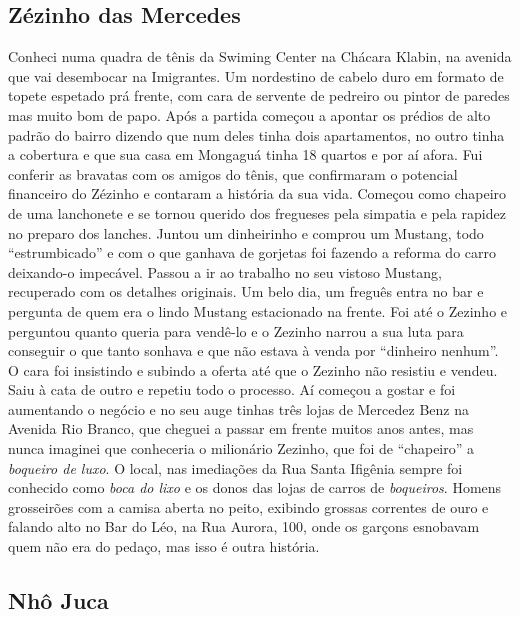 \documentclass[12pt,brazil,]{book}
\begin{document}
\subsection{Zézinho das Mercedes}\label{zuxe9zinho-das-mercedes}

Conheci numa quadra de tênis da Swiming Center na Chácara Klabin, na
avenida que vai desembocar na Imigrantes. Um nordestino de cabelo duro
em formato de topete espetado prá frente, com cara de servente de
pedreiro ou pintor de paredes mas muito bom de papo. Após a partida
começou a apontar os prédios de alto padrão do bairro dizendo que num
deles tinha dois apartamentos, no outro tinha a cobertura e que sua casa
em Mongaguá tinha 18 quartos e por aí afora. Fui conferir as bravatas
com os amigos do tênis, que confirmaram o potencial financeiro do
Zézinho e contaram a história da sua vida. Começou como chapeiro de uma
lanchonete e se tornou querido dos fregueses pela simpatia e pela
rapidez no preparo dos lanches. Juntou um dinheirinho e comprou um
Mustang, todo ``estrumbicado'' e com o que ganhava de gorjetas foi
fazendo a reforma do carro deixando-o impecável. Passou a ir ao trabalho
no seu vistoso Mustang, recuperado com os detalhes originais. Um belo
dia, um freguês entra no bar e pergunta de quem era o lindo Mustang
estacionado na frente. Foi até o Zezinho e perguntou quanto queria para
vendê-lo e o Zezinho narrou a sua luta para conseguir o que tanto
sonhava e que não estava à venda por ``dinheiro nenhum''. O cara foi
insistindo e subindo a oferta até que o Zezinho não resistiu e vendeu.
Saiu à cata de outro e repetiu todo o processo. Aí começou a gostar e
foi aumentando o negócio e no seu auge tinhas três lojas de Mercedez
Benz na Avenida Rio Branco, que cheguei a passar em frente muitos anos
antes, mas nunca imaginei que conheceria o milionário Zezinho, que foi
de ``chapeiro'' a \emph{boqueiro de luxo}. O local, nas imediações da
Rua Santa Ifigênia sempre foi conhecido como \emph{boca do lixo} e os
donos das lojas de carros de \emph{boqueiros}. Homens grosseirões com a
camisa aberta no peito, exibindo grossas correntes de ouro e falando
alto no Bar do Léo, na Rua Aurora, 100, onde os garçons esnobavam quem
não era do pedaço, mas isso é outra história.

\subsection{Nhô Juca}\label{nhuxf4-juca}
\end{document}
